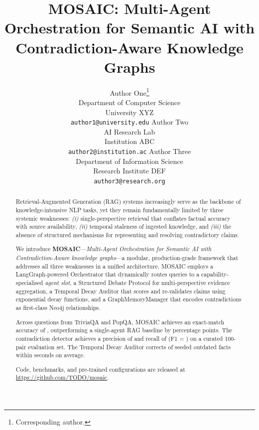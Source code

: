 \documentclass{article}
\title{%
  \textbf{MOSAIC}: Multi-Agent Orchestration for Semantic AI with\\
  Contradiction-Aware Knowledge Graphs%
}
\author{%
  Author One\thanks{Corresponding author.} \\
  Department of Computer Science \\
  University XYZ \\
  \texttt{author1@university.edu}
  \And
  Author Two \\
  AI Research Lab \\
  Institution ABC \\
  \texttt{author2@institution.ac}
  \AND
  Author Three \\
  Department of Information Science \\
  Research Institute DEF \\
  \texttt{author3@research.org}
}
\begin{document}
\maketitle



\begin{abstract}
Retrieval-Augmented Generation (RAG) systems increasingly serve as the
backbone of knowledge-intensive NLP tasks, yet they remain fundamentally
limited by three systemic weaknesses: \emph{(i)} single-perspective retrieval
that conflates factual accuracy with source availability, \emph{(ii)} temporal
staleness of ingested knowledge, and \emph{(iii)} the absence of structured
mechanisms for representing and resolving contradictory claims.

We introduce \textbf{MOSAIC}—\textit{Multi-Agent Orchestration for Semantic
AI with Contradiction-Aware knowledge graphs}—a modular, production-grade
framework that addresses all three weaknesses in a unified architecture.
MOSAIC employs a LangGraph-powered Orchestrator that dynamically routes
queries to a capability-specialised \emph{agent slot}, a Structured Debate
Protocol for multi-perspective evidence aggregation, a Temporal Decay Auditor
that scores and re-validates claims using exponential decay functions, and a
GraphMemoryManager that encodes contradictions as first-class Neo4j
relationships.

Across  questions from TriviaQA and PopQA, MOSAIC achieves an
exact-match accuracy of , outperforming a single-agent RAG
baseline by  percentage points.  The contradiction detector
achieves a precision of  and recall of  (F1
= ) on a curated 100-pair evaluation set.  The Temporal Decay
Auditor corrects  of seeded outdated facts within
 seconds on average.

Code, benchmarks, and pre-trained configurations are released at
\url{https://github.com/TODO/mosaic}.
\end{abstract}


\end{document}
